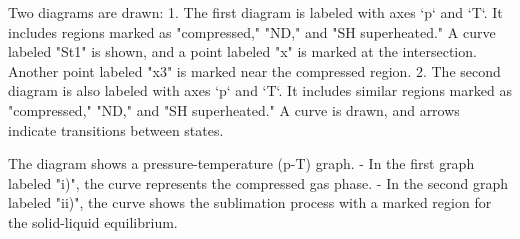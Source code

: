 Two diagrams are drawn:  
1. The first diagram is labeled with axes `p` and `T`. It includes regions marked as "compressed," "ND," and "SH superheated." A curve labeled "St1" is shown, and a point labeled "x" is marked at the intersection. Another point labeled "x3" is marked near the compressed region.  
2. The second diagram is also labeled with axes `p` and `T`. It includes similar regions marked as "compressed," "ND," and "SH superheated." A curve is drawn, and arrows indicate transitions between states.

The diagram shows a pressure-temperature (p-T) graph.  
- In the first graph labeled "i)", the curve represents the compressed gas phase.  
- In the second graph labeled "ii)", the curve shows the sublimation process with a marked region for the solid-liquid equilibrium.